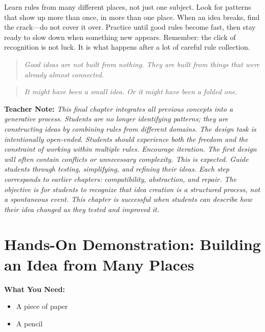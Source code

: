 \documentclass[12pt]{book}
\newenvironment{teachernote}
{\par\medskip\noindent\textbf{Teacher Note:} \itshape}
{\par\medskip}
\begin{document}
Learn rules from many different places, not just one subject. Look for
patterns that show up more than once, in more than one place. When an idea
breaks, find the crack---do not cover it over. Practice until good rules
become fast, then stay ready to slow down when something new appears.
Remember: the click of recognition is not luck. It is what happens after
a lot of careful rule collection.

\begin{quote}\itshape
Good ideas are not built from nothing.
They are built from things that were already almost connected.
\end{quote}

\begin{quote}\itshape
It might have been a small idea.
Or it might have been a folded one.
\end{quote}

\begin{teachernote}
This final chapter integrates all previous concepts into a generative
process. Students are no longer identifying patterns; they are constructing
ideas by combining rules from different domains. The design task is
intentionally open-ended. Students should experience both the freedom and
the constraint of working within multiple rules. Encourage iteration. The
first design will often contain conflicts or unnecessary complexity. This
is expected. Guide students through testing, simplifying, and refining
their ideas. Each step corresponds to earlier chapters: compatibility,
abstraction, and repair. The objective is for students to recognize that
idea creation is a structured process, not a spontaneous event. This
chapter is successful when students can describe how their idea changed
as they tested and improved it.
\end{teachernote}

\section*{Hands-On Demonstration: Building an Idea from Many Places}

\textbf{What You Need:}
\begin{itemize}
  \item A piece of paper
  \item A pencil
\end{itemize}
\end{document}
